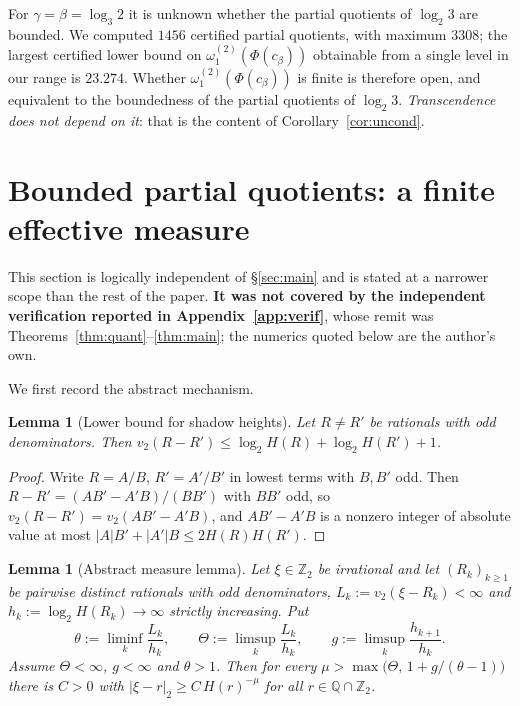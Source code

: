 \documentclass[11pt,reqno]{amsart}
\theoremstyle{plain}
\newtheorem{lemma}[theorem]{Lemma}
\theoremstyle{definition}
\newcommand{\Z}{\mathbb{Z}}
\newcommand{\Q}{\mathbb{Q}}
\newcommand{\Zt}{\Z_2}
\newcommand{\PH}{\Phi}
\newcommand{\om}{\omega_1^{(2)}}
\newcommand{\vtwo}{v_2}
\begin{document}
For $\gamma=\beta=\log_3 2$ it is unknown whether the partial quotients of $\log_2 3$ are bounded.
We computed $1456$ certified partial quotients, with maximum $3308$; the largest certified lower
bound on $\om(\PH(c_\beta))$ obtainable from a single level in our range is $23.274$. Whether
$\om(\PH(c_\beta))$ is finite is therefore open, and equivalent to the boundedness of the partial
quotients of $\log_2 3$. \emph{Transcendence does not depend on it}: that is the content of
Corollary~\ref{cor:uncond}.

\section{Bounded partial quotients: a finite effective measure}\label{sec:measure}

This section is logically independent of \S\ref{sec:main} and is stated at a narrower scope than the
rest of the paper. \textbf{It was not covered by the independent verification reported in
Appendix~\ref{app:verif}}, whose remit was Theorems~\ref{thm:quant}--\ref{thm:main}; the numerics
quoted below are the author's own.

We first record the abstract mechanism.

\begin{lemma}[Lower bound for shadow heights]\label{lem:hlow}
Let $R\ne R'$ be rationals with odd denominators. Then
$\vtwo(R-R')\le\log_2 H(R)+\log_2 H(R')+1$.
\end{lemma}

\begin{proof}
Write $R=A/B$, $R'=A'/B'$ in lowest terms with $B,B'$ odd. Then $R-R'=(AB'-A'B)/(BB')$ with
$BB'$ odd, so $\vtwo(R-R')=\vtwo(AB'-A'B)$, and $AB'-A'B$ is a nonzero integer of absolute value at
most $|A|B'+|A'|B\le2H(R)H(R')$.
\end{proof}

\begin{lemma}[Abstract measure lemma]\label{lem:P}
Let $\xi\in\Zt$ be irrational and let $(R_k)_{k\ge1}$ be pairwise distinct rationals with odd
denominators, $L_k:=\vtwo(\xi-R_k)<\infty$ and $h_k:=\log_2 H(R_k)\to\infty$ strictly increasing.
Put
\[
  \theta:=\liminf_k\frac{L_k}{h_k},\qquad \Theta:=\limsup_k\frac{L_k}{h_k},\qquad
  g:=\limsup_k\frac{h_{k+1}}{h_k}.
\]
Assume $\Theta<\infty$, $g<\infty$ and $\theta>1$. Then for every
$\mu>\max\bigl(\Theta,\,1+g/(\theta-1)\bigr)$ there is $C>0$ with
$|\xi-r|_2\ge C\,H(r)^{-\mu}$ for all $r\in\Q\cap\Zt$.
\end{lemma}
\end{document}
